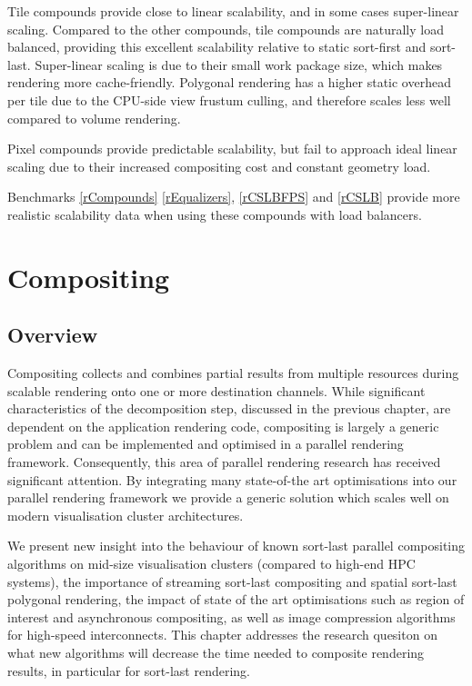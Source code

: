 Tile compounds provide close to linear scalability, and in some cases
super-linear scaling. Compared to the other compounds, tile compounds are
naturally load balanced, providing this excellent scalability relative to
static sort-first and sort-last. Super-linear scaling is due to their small
work package size, which makes rendering more cache-friendly. Polygonal
rendering has a higher static overhead per tile due to the CPU-side view
frustum culling, and therefore scales less well compared to volume rendering.

Pixel compounds provide predictable scalability, but fail to approach ideal
linear scaling due to their increased compositing cost and constant geometry
load.

Benchmarks \ref{rCompounds} \ref{rEqualizers}, \ref{rCSLBFPS} and \ref{rCSLB}
provide more realistic scalability data when using these compounds with load
balancers.

\chapter{Compositing}\label{sCompositing}

\section{Overview}

Compositing collects and combines partial results from multiple resources
during scalable rendering onto one or more destination channels. While
significant characteristics of the decomposition step, discussed in the
previous chapter, are dependent on the application rendering code, compositing
is largely a generic problem and can be implemented and optimised in a parallel
rendering framework. Consequently, this area of parallel rendering research has
received significant attention. By integrating many state-of-the art
optimisations into our parallel rendering framework we provide a generic
solution which scales well on modern visualisation cluster architectures.

We present new insight into the behaviour of known sort-last parallel compositing algorithms on mid-size visualisation clusters (compared to high-end HPC systems), the importance of streaming sort-last compositing and spatial sort-last polygonal rendering, the impact of state of the art optimisations such as region of interest and asynchronous compositing, as well as image compression algorithms for high-speed interconnects. This chapter addresses the research quesiton on what new algorithms will decrease the time needed to composite rendering results, in particular for sort-last rendering.

